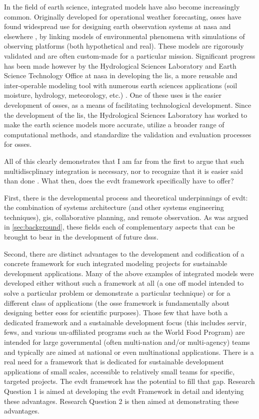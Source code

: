 \documentclass[notitlepage]{article}
\begin{document}
In the field of earth science, integrated models have also become increasingly common. Originally developed for operational weather forecasting, \acp{osse} have found widespread use for designing earth observation systems at \ac{nasa} and elsewhere \cite{masutaniObservingSystemSimulation2010}, by linking models of environmental phenomena with simulations of observing platforms (both hypothetical and real). These models are rigorously validated \cite{erricoDevelopmentValidationObservingsystem2013} and are often custom-made for a particular mission. Significant progress has been made however by the  Hydrological Sciences Laboratory and Earth Science Technology Office at \ac{nasa} in developing the \ac{lis}, a more reusable and inter-operable modeling tool with numerous earth sciences applications (soil moisture, hydrology, meteorology, etc.) \cite{kumarMissionSimulationEvaluation2015}. One of these uses is the easier development of \acp{osse}, as a means of facilitating technological development. Since the development of the \ac{lis}, the Hydrological Sciences Laboratory has worked to make the earth science models more accurate, utilize  a broader range of computational methods, and standardize the validation and evaluation processes for \acp{osse}.

All of this clearly demonstrates that I am far from the first to argue that such multidiscplinary integration is necessary, nor to recognize that it is easier said than done \cite{shahumyanIntegrationLandUse2017}. What then, does the \ac{evdt} framework specifically have to offer? 

First, there is the developmental process and theoretical underpinnings of \ac{evdt}: the combination of systems architecture (and other systems engineering techniques), \ac{gis}, collaborative planning, and remote observation. As was argued in \ref{sec:background}, these fields each of complementary aspects that can be brought to bear in the development of future \acp{dss}.

Second, there are distinct advantages to the development and codification of a concrete framework for such integrated modeling projects for sustainable development applications. Many of the above examples of integrated models were developed either without such a framework at all (a one off model intended to solve a particular problem or demonstrate a particular technique) or for a different class of applications (the \ac{osse} framework is fundamentally about designing better \acp{eos} for scientific purposes). Those few that have both a dedicated framework and a sustainable development focus (this includes \ac{servir}, \ac{fews}, and various \ac{un}-affiliated programs such as the World Food Program) are intended for large governmental (often multi-nation and/or multi-agency) teams and typically are aimed at national or even multinational applications. There is a real need for a framework that is dedicated for sustainable development applications of small scales, accessible to relatively small teams for specific, targeted projects. The \ac{evdt} framework has the potential to fill that gap. Research Question 1 is aimed at developing the \ac{evdt} Framework in detail and identying these advantages. Research Question 2 is then aimed at demonstrating these advantages.
\end{document}
